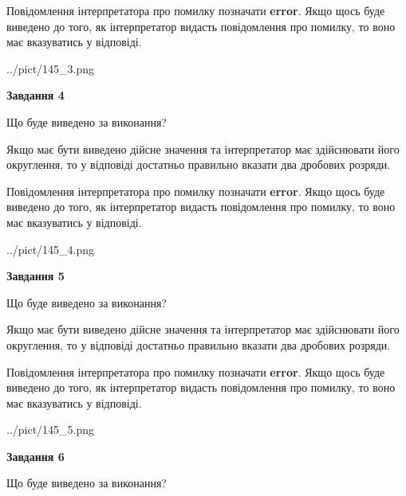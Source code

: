 \documentclass[12pt, ukrainian]{article}
\begin{document}
{\begin {Large}
Повідомлення інтерпретатора про помилку позначати \textbf{error}.
Якщо щось буде виведено до того, як інтерпретатор видасть повідомлення про помилку, 
то воно має вказуватись у відповіді. \par

\begin{center}
	{../pict/145_3.png}
\end{center}
\newpage

{\begin {center}\textbf{Завдання 4}\end {center}}\par
Що буде виведено за виконання? \par

Якщо має бути виведено дійсне значення та інтерпретатор має здійснювати його округлення, 
то у відповіді достатньо правильно вказати два дробових розряди.

Повідомлення інтерпретатора про помилку позначати \textbf{error}.
Якщо щось буде виведено до того, як інтерпретатор видасть повідомлення про помилку, 
то воно має вказуватись у відповіді. \par

\begin{center}
	{../pict/145_4.png}
\end{center}
\newpage

{\begin {center}\textbf{Завдання 5}\end {center}}\par
Що буде виведено за виконання? \par

Якщо має бути виведено дійсне значення та інтерпретатор має здійснювати його округлення, 
то у відповіді достатньо правильно вказати два дробових розряди.

Повідомлення інтерпретатора про помилку позначати \textbf{error}.
Якщо щось буде виведено до того, як інтерпретатор видасть повідомлення про помилку, 
то воно має вказуватись у відповіді. \par

\begin{center}
	{../pict/145_5.png}
\end{center}
\newpage

{\begin {center}\textbf{Завдання 6}\end {center}}\par
Що буде виведено за виконання? \par


\end{Large}}
\end{document}
